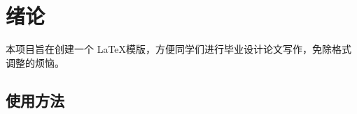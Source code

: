 \section{绪论}
本项目旨在创建一个 \LaTeX 模版，方便同学们进行毕业设计论文写作，免除格式调整的烦恼\supercite{simplepaper}。

\subsection{使用方法}